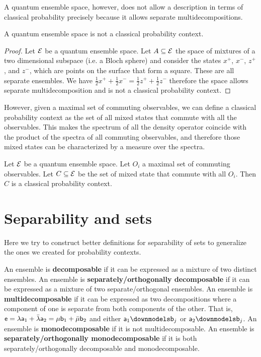 A quantum ensemble space, however, does not allow a description in terms of classical probability precisely because it allows separate multidecompositions.

\begin{prop}
	A quantum ensemble space is not a classical probability context.
\end{prop}

\begin{proof}
	Let $\Ens$ be a quantum ensemble space. Let $A \subseteq \Ens$ the space of mixtures of a two dimensional subspace (i.e. a Bloch sphere) and consider the states $x^+$, $x^-$, $z^+$, and $z^-$, which are points on the surface that form a square. These are all separate ensembles. We have $\frac{1}{2} x^+ + \frac{1}{2} x^- = \frac{1}{2} z^+ + \frac{1}{2} z^-$ therefore the space allows separate multidecomposition and is not a classical probability context.
\end{proof}

However, given a maximal set of commuting observables, we can define a classical probability context as the set of all mixed states that commute with all the observables. This makes the spectrum of all the density operator coincide with the product of the spectra of all commuting observables, and therefore those mixed states can be characterized by a measure over the spectra.

\begin{conj}
	Let $\Ens$ be a quantum ensemble space. Let $O_i$ a maximal set of commuting observables. Let $C \subseteq \Ens$ be the set of mixed state that commute with all $O_i$. Then $C$ is a classical probability context.
\end{conj}



\section{Separability and sets}

Here we try to construct better definitions for separability of sets to generalize the ones we created for probability contexts.

\begin{defn}
	An ensemble is \textbf{decomposable} if it can be expressed as a mixture of two distinct ensembles. An ensemble is \textbf{separately/orthogonally decomposable} if it can be expressed as a mixture of two separate/orthogonal ensembles. An ensemble is \textbf{multidecomposable} if it can be expressed as two decompositions where a component of one is separate from both components of the other. That is, $\ens = \lambda \ens[a]_1 + \bar{\lambda} \ens[a]_2 = \mu \ens[b]_1 +\bar{\mu} \ens[b]_2$ and either $\ens[a]_1 \separate \ens[b]_j$ or $\ens[a]_2 \separate \ens[b]_j$. An ensemble is \textbf{monodecomposable} if it is not multidecomposable. An ensemble is \textbf{separately/orthogonally monodecomposable} if it is both separately/orthogonally decomposable and monodecomposable.
\end{defn}

